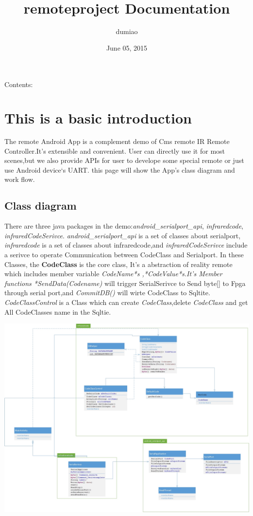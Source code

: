 \documentclass[letterpaper,10pt,english]{sphinxmanual}
\title{remoteproject Documentation}
\date{June 05, 2015}
\author{dumiao}
\begin{document}
\begin{CJK}{UTF8}{gbsn} 

\maketitle
\tableofcontents
{}\label{index::doc}


Contents:


\chapter{This is a basic introduction}
\label{base:welcome-to-remoteproject-s-documentation}\label{base:this-is-a-basic-introduction}\label{base::doc}
The remote Android App  is a complement  demo of Cms remote IR Remote Controller.It's extensible and convenient. User can directly use it for  most scenes,but we also  provide APIs for user to develope  some special remote or just use Android device‘s UART.
this page will show the  App's class diagram and work flow.


\section{Class diagram}
\label{base:class-diagram}
There are three java packages in the demo:\emph{android\_serialport\_api}, \emph{infraredcode}, \emph{infraredCodeSerivce}. \emph{android\_serialport\_api} is a set of classes about serialport, \emph{infraredcode} is a set of classes about infraredcode,and \emph{infraredCodeSerivce} include a  serivce to operate Communication between CodeClass and Serialport. In these Classes, the \textbf{CodeClass} is the core class, It's a abstraction of reality remote which includes member variable \emph{CodeName*s ,*CodeValue*s.It's Member functions  *SendData(Codename)} will trigger SerialSerivce to Send byte{[}{]} to Fpga through serial port,and \emph{CommitDB()} will wirte CodeClass to Sqltite.  \emph{CodeClassControl} is a Class which can create \emph{CodeClass},delete \emph{CodeClass} and get All CodeClasses name in the Sqltie.

\includegraphics{Class.jpg}


\end{CJK}
\end{document}
